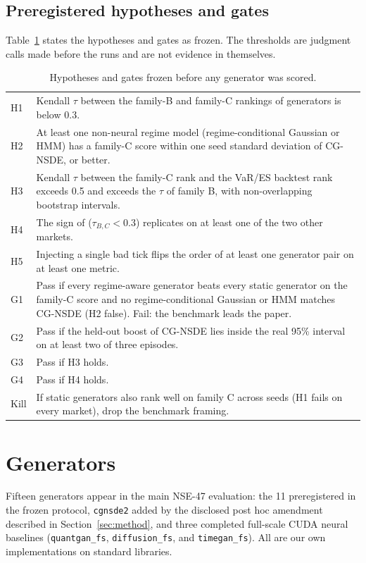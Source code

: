 \documentclass[journal]{IEEEtran}
\begin{document}
\subsection{Preregistered hypotheses and gates}
Table~\ref{tab:prereg} states the hypotheses and gates as frozen. The thresholds are judgment calls made before
the runs and are not evidence in themselves.

\begin{table}[t]
\caption{Hypotheses and gates frozen before any generator was scored.}
\label{tab:prereg}
\centering
\footnotesize
\begin{tabular}{@{}lp{}@{}}
\toprule
H1 & Kendall $\tau$ between the family-B and family-C rankings of generators is below 0.3. \\
H2 & At least one non-neural regime model (regime-conditional Gaussian or HMM) has a family-C score within one
seed standard deviation of CG-NSDE, or better. \\
H3 & Kendall $\tau$ between the family-C rank and the VaR/ES backtest rank exceeds 0.5 and exceeds the $\tau$ of
family B, with non-overlapping bootstrap intervals. \\
H4 & The sign of ($\tau_{B,C}<0.3$) replicates on at least one of the two other markets. \\
H5 & Injecting a single bad tick flips the order of at least one generator pair on at least one metric. \\
\midrule
G1 & Pass if every regime-aware generator beats every static generator on the family-C score and no
regime-conditional Gaussian or HMM matches CG-NSDE (H2 false). Fail: the benchmark leads the paper. \\
G2 & Pass if the held-out boost of CG-NSDE lies inside the real 95\% interval on at least two of three episodes. \\
G3 & Pass if H3 holds. \\
G4 & Pass if H4 holds. \\
Kill & If static generators also rank well on family C across seeds (H1 fails on every market), drop the
benchmark framing. \\
\bottomrule
\end{tabular}
\end{table}

\section{Generators}
\label{sec:generators}
Fifteen generators appear in the main NSE-47 evaluation: the 11 preregistered in the frozen protocol,
\texttt{cgnsde2} added by the disclosed post hoc amendment described in Section~\ref{sec:method}, and three
completed full-scale CUDA neural baselines (\texttt{quantgan\_fs}, \texttt{diffusion\_fs}, and \texttt{timegan\_fs}). All are our
own implementations on standard libraries.
\end{document}
